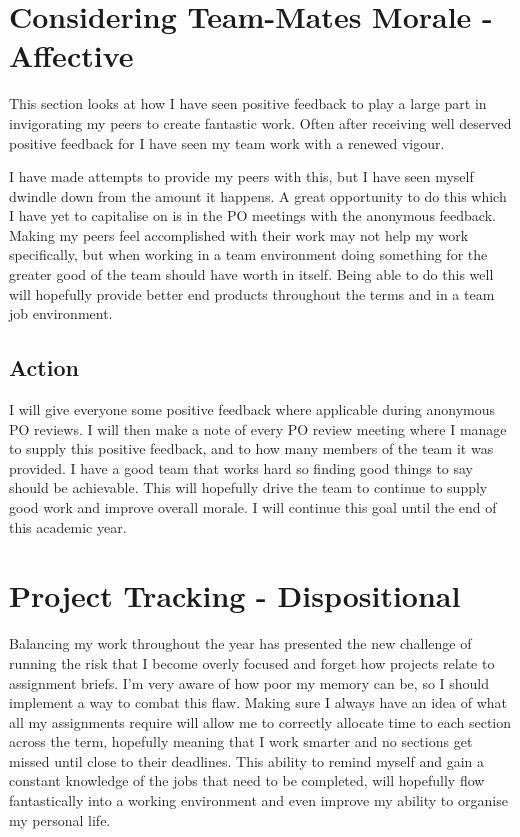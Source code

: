 \documentclass{scrartcl}
\begin{document}
\section{Considering Team-Mates Morale - Affective}
This section looks at how I have seen positive feedback to play a large part in invigorating my peers to create fantastic work. Often after receiving well deserved positive feedback for I have seen my team work with a renewed vigour.

I have made attempts to provide my peers with this, but I have seen myself dwindle down from the amount it happens. A great opportunity to do this which I have yet to capitalise on is in the PO meetings with the anonymous feedback. Making my peers feel accomplished with their work may not help my work specifically, but when working in a team environment doing something for the greater good of the team should have worth in itself. Being able to do this well will hopefully provide better end products throughout the terms and in a team job environment.
\subsection{Action}
I will give everyone some positive feedback where applicable during anonymous PO reviews. I will then make a note of every PO review meeting where I manage to supply this positive feedback, and to how many members of the team it was provided. I have a good team that works hard so finding good things to say should be achievable. This will hopefully drive the team to continue to supply good work and improve overall morale. I will continue this goal until the end of this academic year.

\section{Project Tracking - Dispositional}
Balancing my work throughout the year has presented the new challenge of running the risk that I become overly focused and forget how projects relate to assignment briefs. I'm very aware of how poor my memory can be, so I should implement a way to combat this flaw. Making sure I always have an idea of what all my assignments require will allow me to correctly allocate time to each section across the term, hopefully meaning that I work smarter and no sections get missed until close to their deadlines. This ability to remind myself and gain a constant knowledge of the jobs that need to be completed, will hopefully flow fantastically into a working environment and even improve my ability to organise my personal life.
\end{document}
